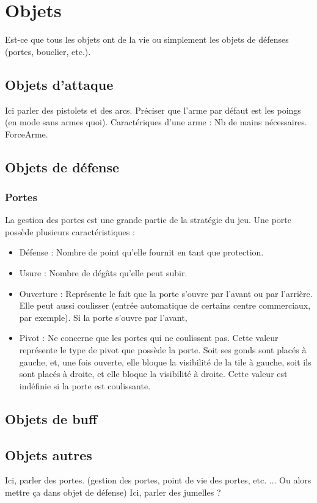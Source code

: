 \section{Objets}
Est-ce que tous les objets ont de la vie ou simplement les objets de défenses (portes, bouclier, etc.).
\subsection{Objets d'attaque}
Ici parler des pistolets et des arcs. Préciser que l'arme par défaut est les poings (en mode sans armes quoi). 
Caractériques d'une arme :
Nb de mains nécessaires.
ForceArme.
\subsection{Objets de défense}
\subsubsection{Portes}
La gestion des portes est une grande partie de la stratégie du jeu. Une porte possède plusieurs caractéristiques :
\begin{itemize}
  \item Défense : Nombre de point qu'elle fournit en tant que protection.
  \item Usure : Nombre de dégâts qu'elle peut subir.
  \item Ouverture : Représente le fait que la porte s'ouvre par l'avant ou par l'arrière. Elle peut aussi coulisser (entrée automatique de certains centre commerciaux, par exemple). Si la porte s'ouvre par l'avant, 
  \item Pivot : Ne concerne que les portes qui ne coulissent pas. Cette valeur représente le type de pivot que possède la porte. Soit ses gonds sont placés à gauche, et, une fois ouverte, elle bloque la visibilité de la tile à gauche, soit ils sont placés à droite, et elle bloque la visibilité à droite. Cette valeur est indéfinie si la porte est coulissante.
\end{itemize}
\subsection{Objets de buff}
\subsection{Objets autres}
Ici, parler des portes. (gestion des portes, point de vie des portes, etc. ... Ou alors mettre ça dans objet de défense)
Ici, parler des jumelles ?